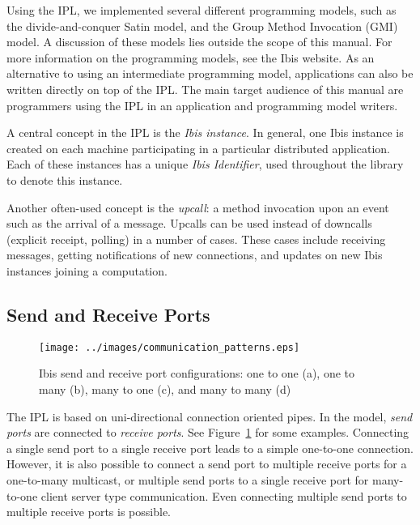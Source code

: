 \documentclass[10pt]{article}
\begin{document}
Using the IPL, we implemented several different programming models, such
as the divide-and-conquer Satin model, and the Group Method
Invocation (GMI) model. A discussion of these models lies outside the
scope of this manual. For more information on the programming models,
see the Ibis website. As an alternative to using an intermediate
programming model, applications can also be written directly on top of
the IPL. The main target audience of this manual are programmers using
the IPL in an application and programming model writers.

A central concept in the IPL is the \emph{Ibis instance}. In general,
one Ibis instance is created on each machine participating in a
particular distributed application. Each of these instances has a unique
\emph{Ibis Identifier}, used throughout the library to denote this
instance.

Another often-used concept is the \emph{upcall}: a method invocation
upon an event such as the arrival of a message. Upcalls can be used
instead of downcalls (explicit receipt, polling) in a number of cases.
These cases include receiving messages, getting notifications of new
connections, and updates on new Ibis instances joining a computation.

\subsection{Send and Receive Ports}


\begin{figure}[t] \centering
\texttt{[image: ../images/communication\_patterns.eps]}
\caption{\label{ports}Ibis send and receive port configurations: one to one (a), one to many (b), many to one (c), and many to many (d)}
\end{figure}

The IPL is based on uni-directional connection oriented pipes. In the
model, \emph{send ports} are connected to \emph{receive ports}. See
Figure~\ref{ports} for some examples. Connecting a single send port to a
single receive port leads to a simple one-to-one connection. However, it is
also possible to connect a send port to multiple receive ports for a
one-to-many multicast, or multiple send ports to a single receive port
for many-to-one client server type communication. Even connecting
multiple send ports to multiple receive ports is possible.
\end{document}
